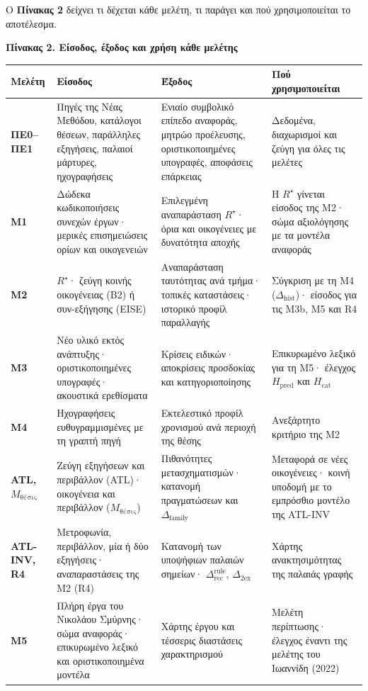 \documentclass[11pt,a4paper]{article}
\newcommand{\dhist}{\Delta_{\mathrm{hist}}}
\begin{document}
Ο \textbf{Πίνακας 2} δείχνει τι δέχεται κάθε μελέτη, τι παράγει και πού χρησιμοποιείται το αποτέλεσμα.

\begin{center}
\begin{minipage}{\linewidth}
\textbf{Πίνακας 2. Είσοδος, έξοδος και χρήση κάθε μελέτης}\par\smallskip\footnotesize
\begin{tabularx}{\linewidth}{@{}>{\bfseries}L{1.75cm}YYY@{}}
\toprule
Μελέτη & \textbf{Είσοδος} & \textbf{Έξοδος} & \textbf{Πού χρησιμοποιείται}\\\midrule
ΠΕ0--ΠΕ1 & Πηγές της Νέας Μεθόδου, κατάλογοι θέσεων, παράλληλες εξηγήσεις, παλαιοί μάρτυρες, ηχογραφήσεις & Ενιαίο συμβολικό επίπεδο αναφοράς, μητρώο προέλευσης, οριστικοποιημένες υπογραφές, αποφάσεις επάρκειας & Δεδομένα, διαχωρισμοί και ζεύγη για όλες τις μελέτες\\
Μ1 & Δώδεκα κωδικοποιήσεις συνεχών έργων· μερικές επισημειώσεις ορίων και οικογενειών & Επιλεγμένη αναπαράσταση $R^\star$· όρια και οικογένειες με δυνατότητα αποχής & Η $R^\star$ γίνεται είσοδος της Μ2· σώμα αξιολόγησης με τα μοντέλα αναφοράς\\
Μ2 & $R^\star$· ζεύγη κοινής οικογένειας (B2) ή συν-εξήγησης (EISE) & Αναπαράσταση ταυτότητας ανά τμήμα· τοπικές καταστάσεις· ιστορικό προφίλ παραλλαγής & Σύγκριση με τη Μ4 ($\dhist$)· είσοδος για τις Μ3b, Μ5 και R4\\
Μ3 & Νέο υλικό εκτός ανάπτυξης· οριστικοποιημένες υπογραφές· ακουστικά ερεθίσματα & Κρίσεις ειδικών· αποκρίσεις προσδοκίας και κατηγοριοποίησης & Επικυρωμένο λεξικό για τη Μ5· έλεγχος $H_{\mathrm{pred}}$ και $H_{\mathrm{cat}}$\\
Μ4 & Ηχογραφήσεις ευθυγραμμισμένες με τη γραπτή πηγή & Εκτελεστικό προφίλ χρονισμού ανά περιοχή της θέσης & Ανεξάρτητο κριτήριο της Μ2\\
ATL, $M_{\text{θέσις}}$ & Ζεύγη εξηγήσεων και περιβάλλον (ATL)· οικογένεια και περιβάλλον ($M_{\text{θέσις}}$) & Πιθανότητες μετασχηματισμών· κατανομή πραγματώσεων και $\Delta_{\mathrm{family}}$ & Μεταφορά σε νέες οικογένειες· κοινή υποδομή με το εμπρόσθιο μοντέλο της ATL-INV\\
ATL-INV, R4 & Μετροφωνία, περιβάλλον, μία ή δύο εξηγήσεις· αναπαραστάσεις της Μ2 (R4) & Κατανομή των υποψήφιων παλαιών σημείων· $\Delta^{\mathrm{rule}}_{\mathrm{rec}}$, $\Delta_{\mathrm{2ex}}$ & Χάρτης ανακτησιμότητας της παλαιάς γραφής\\
Μ5 & Πλήρη έργα του Νικολάου Σμύρνης· σώμα αναφοράς· επικυρωμένο λεξικό και οριστικοποιημένα μοντέλα & Χάρτης έργου και τέσσερις διαστάσεις χαρακτηρισμού & Μελέτη περίπτωσης· έλεγχος έναντι της μελέτης του Ιωαννίδη (2022)\\\bottomrule
\end{tabularx}
\end{minipage}
\end{center}
\end{document}
